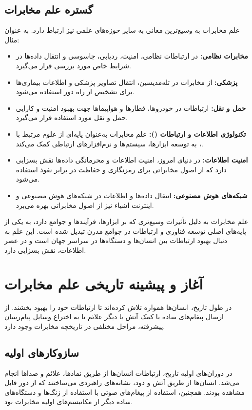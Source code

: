 \subsection{گستره علم مخابرات}
علم مخابرات به وسیع‌ترین معانی به سایر حوزه‌های علمی نیز ارتباط دارد. به عنوان مثال:
\begin{itemize}
	\item \textbf{مخابرات نظامی:} در ارتباطات نظامی، امنیت، ردیابی، جاسوسی و انتقال داده‌ها در شرایط خاص مورد بررسی قرار می‌گیرد.
	
	\item \textbf{پزشکی:} از مخابرات در تله‌مدیسین، انتقال تصاویر پزشکی و اطلاعات بیماری‌ها برای تشخیص از راه دور استفاده می‌شود.
	
	\item \textbf{حمل و نقل:} ارتباطات در خودروها، قطارها و هواپیماها جهت بهبود امنیت و کارایی حمل و نقل مورد استفاده قرار می‌گیرد.
	
	\item \textbf{تکنولوژی اطلاعات و ارتباطات ():} علم مخابرات به‌عنوان پایه‌ای از علوم مرتبط با ، به توسعه ابزارها، سیستم‌ها و نرم‌افزارهای ارتباطی کمک می‌کند.
	
	\item \textbf{امنیت اطلاعات:} در دنیای امروز، امنیت اطلاعات و محرمانگی داده‌ها نقش بسزایی دارد که از اصول مخابراتی برای رمزنگاری و حفاظت در برابر نفوذ استفاده می‌شود.
	
	\item \textbf{شبکه‌های هوش مصنوعی:} انتقال داده‌ها و اطلاعات در شبکه‌های هوش مصنوعی و اینترنت اشیاء نیز از اصول مخابراتی بهره می‌برد.
\end{itemize}

علم مخابرات به دلیل تأثیرات وسیع‌تری که بر ابزارها، فرآیندها و جوامع دارد، به یکی از پایه‌های اصلی توسعه فناوری و ارتباطات در جوامع مدرن تبدیل شده است. این علم به دنبال بهبود ارتباطات بین انسان‌ها و دستگاه‌ها در سراسر جهان است و در عصر اطلاعات، نقش بسزایی دارد.
\section{آغاز و پیشینه تاریخی علم مخابرات}

در طول تاریخ، انسان‌ها همواره تلاش کرده‌اند تا ارتباطات خود را بهبود بخشند. از ارسال پیغام‌های ساده با کمک آتش یا دیگر علائم تا به اختراع وسایل پیام‌رسان پیشرفته، مراحل مختلفی در تاریخچه مخابرات وجود دارد.

\subsection{سازوکارهای اولیه}
در دوران‌های اولیه تاریخ، ارتباطات انسان‌ها از طریق نمادها، علائم و صداها انجام می‌شد. انسان‌ها از طریق آتش و دود، نشانه‌های راهبردی می‌ساختند که از دور قابل مشاهده بودند. همچنین، استفاده از پیغام‌های صوتی با استفاده از زنگ‌ها و دستگاه‌های ساده دیگر از مکانیسم‌های اولیه مخابرات بود.

